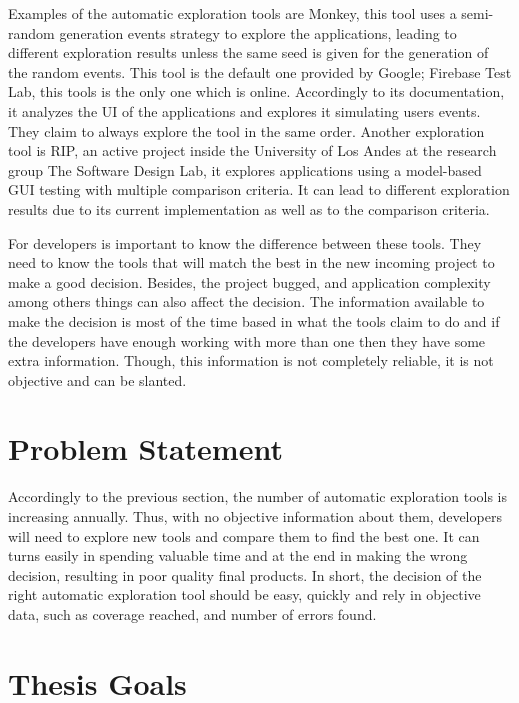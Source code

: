 Examples of the automatic exploration tools are Monkey, this tool uses a semi-random generation events strategy to explore the applications, leading to different exploration results unless the same seed is given for the generation of the random events. This tool is the default one provided by Google; Firebase Test Lab, this tools is the only one which is online. Accordingly to its documentation, it analyzes the UI of the applications and explores it simulating users events. They claim to always explore the tool in the same order. Another exploration tool is RIP, an active project inside the University of Los Andes at the research group The Software Design Lab, it explores applications using a model-based GUI testing with multiple comparison criteria. It can lead to different exploration results due to its current implementation as well as to the comparison criteria. 

For developers is important to know the difference between these tools. They need to know the tools that will match the best in the new incoming project to make a good decision. Besides, the project bugged, and application complexity among others things can also affect the decision. The information available to make the decision is most of the time based in what the tools claim to do and if the developers have enough working with more than one then they have some extra information. Though, this information is not completely reliable, it is not objective and can be slanted.



\section{Problem Statement}

Accordingly to the previous section, the number of automatic exploration tools is increasing annually. Thus, with no objective information about them, developers  will need to explore new tools and compare them to find the best one. It can turns easily in spending valuable time and at the end in making the wrong decision, resulting in poor quality final products. In short, the decision of the right automatic exploration tool should be easy, quickly and rely in objective data, such as coverage reached, and number of errors found.

\section{Thesis  Goals}\label{sec:thesisGoals}

